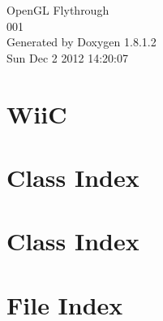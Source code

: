 \documentclass{book}
\begin{document}
\hypersetup{pageanchor=false,citecolor=blue}
\begin{titlepage}
\vspace*{7cm}
\begin{center}
{\Large Open\-G\-L Flythrough \\[1ex]\large 001 }\\
\vspace*{1cm}
{\large Generated by Doxygen 1.8.1.2}\\
\vspace*{0.5cm}
{\small Sun Dec 2 2012 14:20:07}\\
\end{center}
\end{titlepage}
\clearemptydoublepage
{}
\tableofcontents
\clearemptydoublepage
{}
\hypersetup{pageanchor=true,citecolor=blue}
\chapter{Wii\-C}
\label{index}\hypertarget{index}{}
\chapter{Class Index}

\chapter{Class Index}

\chapter{File Index}

\end{document}
